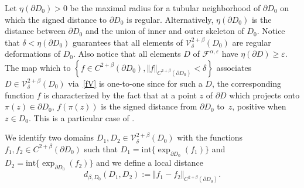 \documentclass[JEP,XML,SOM,Unicode,NoFloatCountersInSection,published]{cedram}
\theoremstyle{plain}
\theoremstyle{definition}
\newcommand{\inte}{\mathrm{int}}
\let\di\displaystyle
\let\b\beta
\let\d\delta
\let\e\varepsilon
\newcommand{\cF}{\mathcal{F}}
\begin{document}
Let $\eta(\partial D_0)>0$ be the maximal radius for a tubular neighborhood of $\partial D_0$ on which the signed distance to $\partial D_0$ is regular. Alternatively, $\eta(\partial D_0)$ is the distance between $\partial D_0$ and the union of inner and outer skeleton of $D_0$.
Notice that $\d < \eta(\partial D_0)$
guarantees that
all elements of $\mathcal{V}_\d^{2+\b}(D_0)$ are regular deformations of $D_0$. Also notice that all elements $D$ of $\cF^{\alpha,\e}$ have $\eta(\partial D)\ge \e$. The map which to $\di \left\{f \in C^{2+ \b} (\partial D_0), \Vert f \Vert_{C^{2 +\b}(\partial D_0)} < \d \right\}$ associates $D\in \mathcal{V}_\d^{2+\b}(D_0)$ via~\eqref{fV} is one-to-one since for such a $D$,
the corresponding function $f$ is characterized by the fact that at a point $z$ of $\partial D$ which projects onto $\pi(z)\in \partial D_0$, $f(\pi(z))$ is the signed distance from $\partial D_0$ to~$z$, positive when $z\in D_0$. This is a particular case of \cite[Th.\,1.5]{CMM91}.

We identify two domains $ D_1, D_2 \!\in\! \mathcal{V}_\d^{2+\b}(D_0) $ with the functions $ f_1, f_2 \!\in\! C^{2+ \b} (\partial D_0) $ such that
$ D_1 = \inte \{\exp_{\partial D_0} (f_1)\}$ and $ D_2 = \inte \{\exp_{\partial D_0} (f_2)\}$ and we define a local distance
\begin{equation}\label{dD}
d_{\b,D_0}(D_1,D_2):= \Vert f_1 -f_2 \Vert_{C^{2+\b}(\partial D_0)}.
\end{equation}
\end{document}
